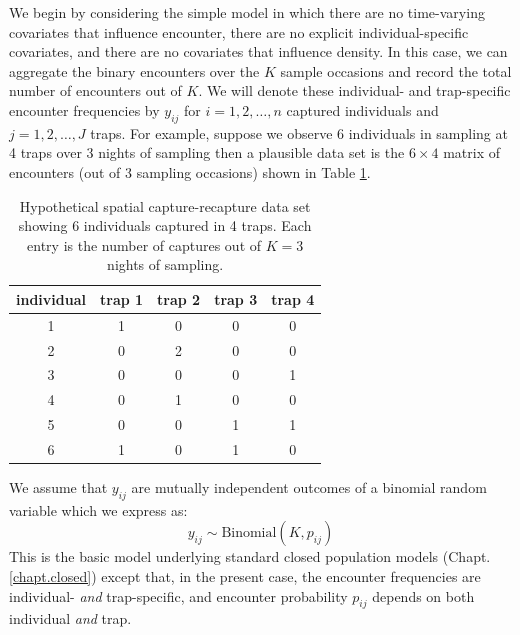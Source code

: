 We begin by considering the simple model in which there are
no time-varying covariates that influence encounter, there are no
explicit individual-specific covariates, and there are no covariates
that influence density. In this case, we can aggregate the binary
encounters over the $K$ sample occasions and record the total number
of encounters out of $K$. We will denote these individual- and
trap-specific encounter frequencies by $y_{ij}$ for $i=1,2,\ldots,n$
captured individuals and $j=1,2,\ldots,J$ traps.  For example, suppose
we observe 6 individuals in sampling at 4 traps over 3 nights of
sampling then a plausible data set is the $6 \times 4$ matrix of
encounters (out of 3 sampling occasions)  shown in Table \ref{scr0.tab.data}.
\begin{table}
\centering
\caption{Hypothetical spatial capture-recapture data set showing 6
  individuals captured in 4 traps.
Each entry is the number of captures out of
 $K=3$ nights of sampling.
}
\begin{tabular}{ccccc}
\hline \hline
individual &  trap 1 & trap 2 & trap 3 & trap 4 \\ \hline
1  &   1  &   0  &   0  &   0 \\
2  &   0  &   2  &   0  &   0 \\
3  &   0  &   0  &   0  &   1 \\
4  &   0  &   1  &   0  &   0 \\
5  &   0  &   0  &   1  &   1 \\
6  &   1  &   0  &   1  &   0 \\ \hline
\end{tabular}
\label{scr0.tab.data}
\end{table}
We assume that $y_{ij}$ are
 mutually independent outcomes of a binomial random variable which we
 express as:
\begin{equation}
	y_{ij} \sim \mbox{Binomial}(K, p_{ij})
\label{scr0.eq.bin}
\end{equation}
This is the basic model underlying standard closed population models
(Chapt. \ref{chapt.closed}) except that, in the present case, the
encounter frequencies are individual- {\it and} trap-specific, and encounter probability $p_{ij}$ depends on both individual {\it and}
trap.


